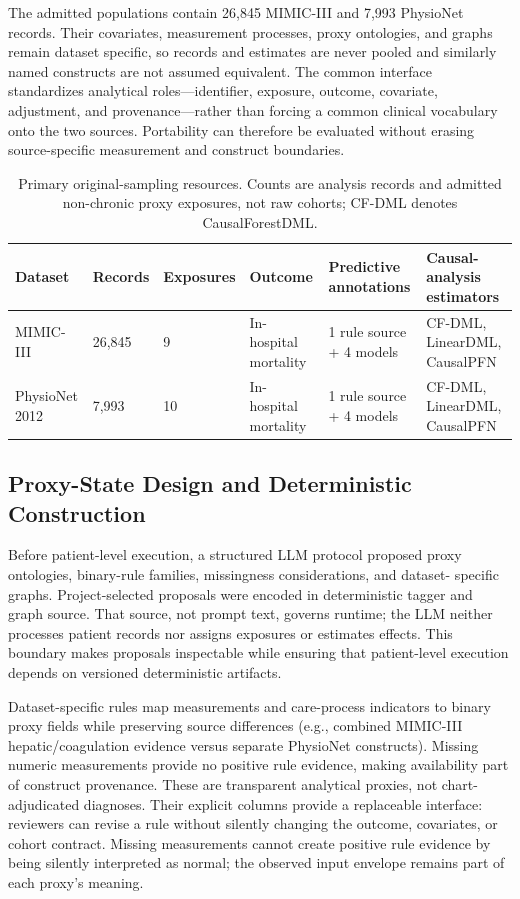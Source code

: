 \documentclass[letterpaper]{article}
\begin{document}
The admitted populations contain 26,845 MIMIC-III and 7,993 PhysioNet records.
Their covariates, measurement processes, proxy ontologies, and graphs remain
dataset specific, so records and estimates are never pooled and similarly named
constructs are not assumed equivalent. The common interface standardizes
analytical roles---identifier, exposure, outcome, covariate, adjustment, and
provenance---rather than forcing a common clinical vocabulary onto the two
sources. Portability can therefore be evaluated without erasing source-specific
measurement and construct boundaries.

\begin{table}[t]
  \centering
  \small
  \begin{tabular}{@{}p{}p{}p{}p{}p{}p{}@{}}
    \toprule
    Dataset & Records & Exposures & Outcome & Predictive annotations & Causal-analysis estimators \\
    \midrule
    MIMIC-III & 26,845 & 9 & In-hospital mortality & 1 rule source + 4 models & CF-DML, LinearDML, CausalPFN \\
    PhysioNet 2012 & 7,993 & 10 & In-hospital mortality & 1 rule source + 4 models & CF-DML, LinearDML, CausalPFN \\
    \bottomrule
  \end{tabular}
  \caption{Primary original-sampling resources. Counts are analysis records and
  admitted non-chronic proxy exposures, not raw cohorts; CF-DML denotes
  CausalForestDML.}
  \label{tab:resources}
\end{table}

\subsection{Proxy-State Design and Deterministic Construction}

Before patient-level execution, a structured LLM protocol proposed proxy
ontologies, binary-rule families, missingness considerations, and dataset-
specific graphs. Project-selected proposals were encoded in deterministic tagger
and graph source. That source, not prompt text, governs runtime; the LLM neither
processes patient records nor assigns exposures or estimates effects. This
boundary makes proposals inspectable while ensuring that patient-level execution
depends on versioned deterministic artifacts.

Dataset-specific rules map measurements and care-process indicators to binary
proxy fields while preserving source differences (e.g., combined MIMIC-III
hepatic/coagulation evidence versus separate PhysioNet constructs). Missing
numeric measurements provide no positive rule evidence, making availability
part of construct provenance. These are transparent analytical proxies, not
chart-adjudicated diagnoses. Their explicit columns provide a replaceable
interface: reviewers can revise a rule without silently changing the outcome,
covariates, or cohort contract. Missing measurements cannot create positive rule
evidence by being silently interpreted as normal; the observed input envelope
remains part of each proxy's meaning.
\end{document}
